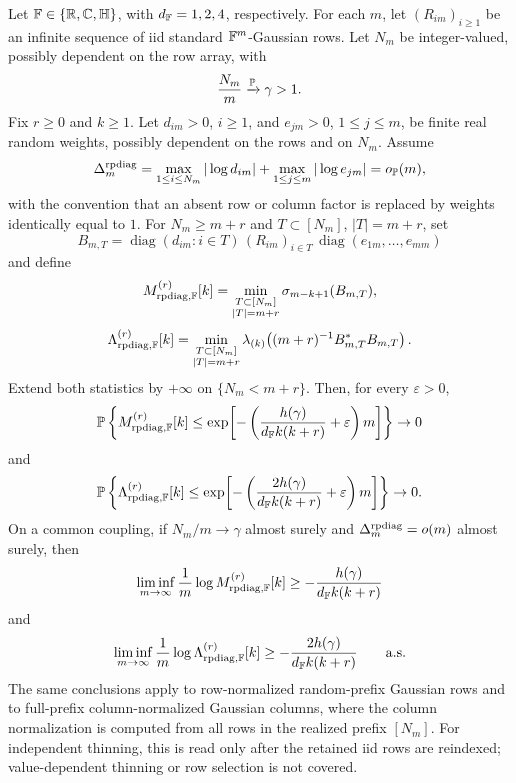 \begin{corollary}\label{cor:random-prefix-diagonal-fixed-excess-fixed-k}
Let \(\mathbb{F}\in\{\mathbb{R},\mathbb{C},\mathbb{H}\}\), with \(d_{\mathbb{F}}=1,2,4\), respectively.  For each
\(m\), let \((R_{im})_{i\ge1}\) be an infinite sequence of iid standard
\(\mathbb{F}^m\)-Gaussian rows.  Let \(N_m\) be integer-valued, possibly dependent on
the row array, with
\[
  \frac{N_m}{m}\xrightarrow{\mathbb{P}}\gamma>1 .
\]
Fix \(r\ge0\) and \(k\ge1\).  Let \(d_{im}>0\), \(i\ge1\), and
\(e_{jm}>0\), \(1\le j\le m\), be finite real random weights, possibly
dependent on the rows and on \(N_m\).  Assume
\[
  \Delta_m^{\rm rpdiag}
  =
  \max_{1\le i\le N_m}|\log d_{im}|
  +\max_{1\le j\le m}|\log e_{jm}|
  =o_{\mathbb{P}}(m),
\]
with the convention that an absent row or column factor is replaced by weights
identically equal to \(1\).  For \(N_m\ge m+r\) and \(T\subset[N_m]\),
\(|T|=m+r\), set
\[
  B_{m,T}=\operatorname{diag}(d_{im}:i\in T)\,(R_{im})_{i\in T}\,
  \operatorname{diag}(e_{1m},\ldots,e_{mm})
\]
and define
\[
  M_{\rm rpdiag,\mathbb{F}}^{(r)}[k]
  =
  \min_{\substack{T\subset[N_m]\\ |T|=m+r}}
  \sigma_{m-k+1}(B_{m,T}),
\]
\[
  \Lambda_{\rm rpdiag,\mathbb{F}}^{(r)}[k]
  =
  \min_{\substack{T\subset[N_m]\\ |T|=m+r}}
  \lambda_{(k)}\!\left((m+r)^{-1}B_{m,T}^*B_{m,T}\right).
\]
Extend both statistics by \(+\infty\) on \(\{N_m<m+r\}\).  Then, for every
\(\varepsilon>0\),
\[
  \mathbb{P}\left\{M_{\rm rpdiag,\mathbb{F}}^{(r)}[k]\le
  \exp\!\left[-\left(\frac{h(\gamma)}{d_{\mathbb{F}} k(k+r)}
    +\varepsilon\right)m\right]\right\}\to0
\]
and
\[
  \mathbb{P}\left\{\Lambda_{\rm rpdiag,\mathbb{F}}^{(r)}[k]\le
  \exp\!\left[-\left(\frac{2h(\gamma)}{d_{\mathbb{F}} k(k+r)}
    +\varepsilon\right)m\right]\right\}\to0.
\]
On a common coupling, if \(N_m/m\to\gamma\) almost surely and
\(\Delta_m^{\rm rpdiag}=o(m)\) almost surely, then
\[
  \liminf_{m\to\infty}\frac1m\log M_{\rm rpdiag,\mathbb{F}}^{(r)}[k]
  \ge -\frac{h(\gamma)}{d_{\mathbb{F}} k(k+r)}
\]
and
\[
  \liminf_{m\to\infty}\frac1m\log \Lambda_{\rm rpdiag,\mathbb{F}}^{(r)}[k]
  \ge -\frac{2h(\gamma)}{d_{\mathbb{F}} k(k+r)}
  \qquad\hbox{a.s.}
\]
The same conclusions apply to row-normalized random-prefix Gaussian rows and
to full-prefix column-normalized Gaussian columns, where the column
normalization is computed from all rows in the realized prefix \([N_m]\).  For
independent thinning, this is read only after the retained iid rows are
reindexed; value-dependent thinning or row selection is not covered.
\end{corollary}

